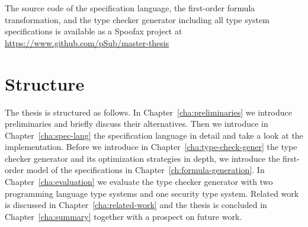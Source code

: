 The source code of the specification language, the first-order formula
transformation, and the type checker generator including all type
system specifications is available as a Spoofax project at
\url{https://www.github.com/pSub/master-thesis}

\section{Structure}
The thesis is structured as follows. In
Chapter~\ref{cha:preliminaries} we introduce preliminaries and briefly
discuss their alternatives. Then we introduce in
Chapter~\ref{cha:spec-lang} the specification language in detail and
take a look at the implementation. Before we introduce in
Chapter~\ref{cha:type-check-gener} the type checker generator and its
optimization strategies in depth, we introduce the first-order model
of the specifications in Chapter~\ref{ch:formula-generation}. In
Chapter~\ref{cha:evaluation} we evaluate the type checker generator
with two programming language type systems and one security type
system. Related work is discussed in Chapter~\ref{cha:related-work}
and the thesis is concluded in Chapter~\ref{cha:summary} together with
a prospect on future work.

